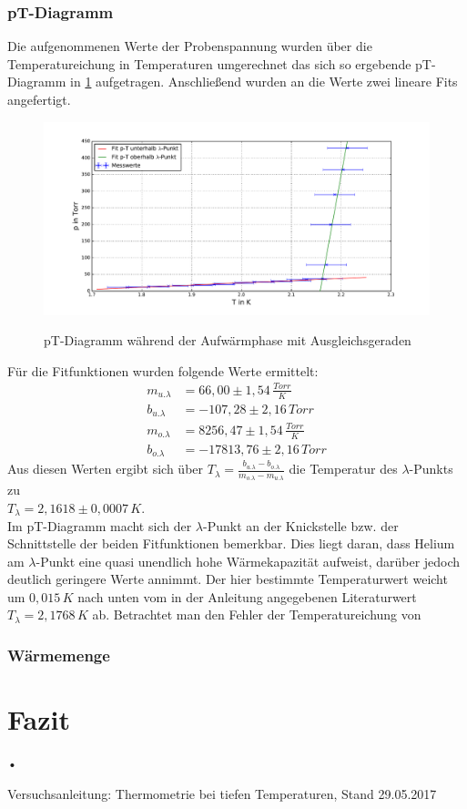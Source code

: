 \documentclass[twoside,colorback,accentcolor=tud4c,11pt]{tudreport}
\begin{document}
\subsection{pT-Diagramm}
Die aufgenommenen Werte der Probenspannung wurden über die Temperatureichung in Temperaturen umgerechnet das sich so ergebende pT-Diagramm in \ref{pTdia} aufgetragen. Anschließend wurden an die Werte zwei lineare Fits angefertigt.
\begin{figure}[H]
\centering
   	\begin{minipage}[b]{1.0\textwidth}
   	\includegraphics[width=\textwidth]{graphics/pT.pdf}
  	\label{pTdia}
   	\end{minipage}
\caption{pT-Diagramm während der Aufwärmphase mit Ausgleichsgeraden}	
\end{figure}
Für die Fitfunktionen wurden folgende Werte ermittelt:
\begin{align}
m_{u.\lambda}&=66,00\pm 1,54 \,\si{\frac{Torr}{K}}\\
b_{u.\lambda}&=-107,28\pm 2,16\,\si{Torr}\\
m_{o.\lambda}&=8256,47\pm 1,54 \,\si{\frac{Torr}{K}}\\
b_{o.\lambda}&=-17813,76\pm 2,16\,\si{Torr}
\end{align}
Aus diesen Werten ergibt sich über $T_{\lambda}=\frac{b_{u.\lambda}-b_{o.\lambda}}{m_{o.\lambda}-m_{u.\lambda}}$ die Temperatur des $\lambda$-Punkts zu\\ $T_{\lambda}=2,1618\pm 0,0007\,\si{K}$.\\
Im pT-Diagramm macht sich der $\lambda$-Punkt an der Knickstelle bzw. der Schnittstelle der beiden Fitfunktionen bemerkbar. Dies liegt daran, dass Helium am $\lambda$-Punkt eine quasi unendlich hohe Wärmekapazität aufweist, darüber jedoch deutlich geringere Werte annimmt. Der hier bestimmte Temperaturwert  weicht um $0,015\,\si{K}$ nach unten vom in der Anleitung angegebenen Literaturwert $T_{\lambda}=2,1768\,\si{K}$ ab. Betrachtet man den Fehler der Temperatureichung von 
\subsection{Wärmemenge}
\chapter{Fazit}	
•
\renewcommand{\bibname}{Literatur}
\begin{thebibliography}{0}
 Versuchsanleitung: Thermometrie bei tiefen Temperaturen, Stand 29.05.2017

\end{thebibliography}
\end{document}
